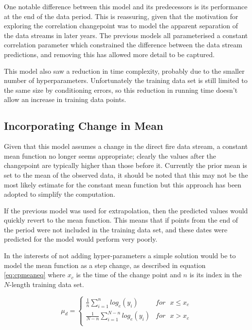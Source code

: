 \documentclass[a4paper,11pt]{report}
\begin{document}
One notable difference between this model and its predecessors is its performance at the end of the data period. This is reassuring, given that the motivation for exploring the correlation changepoint was to model the apparent separation of the data streams in later years. The previous models all parameterised a constant correlation parameter which constrained the difference between the data stream predictions, and removing this has allowed more detail to be captured.

This model also saw a reduction in time complexity, probably due to the smaller number of hyperparameters. Unfortunately the training data set is still limited to the same size by conditioning errors, so this reduction in running time doesn't allow an increase in training data points.

\subsection{Incorporating Change in Mean}

Given that this model assumes a change in the direct fire data stream, a constant mean function no longer seems appropriate; clearly the values after the changepoint are typically higher than those before it. Currently the prior mean is set to the mean of the observed data, it should be noted that this may not be the most likely estimate for the constant mean function but this approach has been adopted to simplify the computation. \par

If the previous model was used for extrapolation, then the predicted values would quickly revert to the mean function. This means that if points from the end of the period were not included in the training data set, and these dates were predicted for the model would perform very poorly. \par

In the interests of not adding hyper-parameters a simple solution would be to model the mean function as a step change, as described in equation \ref{eq:cpmeaneq} where \(x_c\) is the time of the change point and \(n\) is its index in the \(N\)-length training data set.

\begin{equation} \label{eq:cpmeaneq}
\mu_d = \begin{cases}
\frac{1}{n} \displaystyle \sum_{i=1}^{n} log_e(y_i) & for \text{ } x \leq x_c \\
\frac{1}{N-n} \displaystyle \sum_{i=1}^{N-n} log_e(y_i) & for \text{ } x > x_c \\ 
\end{cases}
\end{equation}
\end{document}
